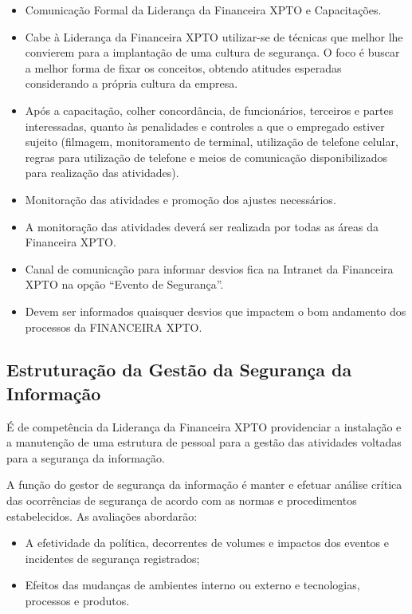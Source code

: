 \documentclass[a4paper,12pt]{article}
\begin{document}
\begin{itemize}
    \item Comunicação Formal da Liderança da Financeira XPTO e Capacitações.
    \item Cabe à Liderança da Financeira XPTO utilizar-se de técnicas que melhor lhe convierem para a implantação de uma cultura de segurança. O foco é buscar a melhor forma de fixar os conceitos, obtendo atitudes esperadas considerando a própria cultura da empresa.
    \item Após a capacitação, colher concordância, de funcionários, terceiros e partes interessadas, quanto às penalidades e controles a que o empregado estiver sujeito (filmagem, monitoramento de terminal, utilização de telefone celular, regras para utilização de telefone e meios de comunicação disponibilizados para realização das atividades).
    \item Monitoração das atividades e promoção dos ajustes necessários.
    \item A monitoração das atividades deverá ser realizada por todas as áreas da Financeira XPTO.
    \item Canal de comunicação para informar desvios fica na Intranet da Financeira XPTO na opção “Evento de Segurança”.
    \item Devem ser informados quaisquer desvios que impactem o bom andamento dos processos da FINANCEIRA XPTO.
\end{itemize}

\subsection{Estruturação da Gestão da Segurança da Informação}

É de competência da Liderança da Financeira XPTO providenciar a instalação e a manutenção de uma estrutura de pessoal para a gestão das atividades voltadas para a segurança da informação.

A função do gestor de segurança da informação é manter e efetuar análise crítica das ocorrências de segurança de acordo com as normas e procedimentos estabelecidos. As avaliações abordarão:

\begin{itemize}
    \item A efetividade da política, decorrentes de volumes e impactos dos eventos e incidentes de segurança registrados;
    \item Efeitos das mudanças de ambientes interno ou externo e tecnologias, processos e produtos.
\end{itemize}
\end{document}
